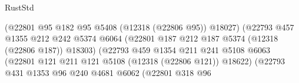 \begin{lexlean}{RustStd}
\begin{coremodule}
                                                (@22801
                                                  @95
                                                  @182
                                                  @95
                                                  @5408
                                                  (@12318 (@22806 @95))
                                                  @18027)
                                                (@22793
                                                  @457
                                                  @1355
                                                  @212
                                                  @242
                                                  @5374
                                                  @6064
                                                  (@22801
                                                    @187
                                                    @212
                                                    @187
                                                    @5374
                                                    (@12318 (@22806 @187))
                                                    @18303)
                                                  (@22793
                                                    @459
                                                    @1354
                                                    @211
                                                    @241
                                                    @5108
                                                    @6063
                                                    (@22801
                                                      @121
                                                      @211
                                                      @121
                                                      @5108
                                                      (@12318 (@22806 @121))
                                                      @18622)
                                                    (@22793
                                                      @431
                                                      @1353
                                                      @96
                                                      @240
                                                      @4681
                                                      @6062
                                                      (@22801
                                                        @318
                                                        @96

\end{coremodule}
\end{lexlean}
